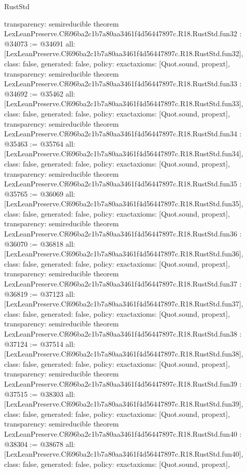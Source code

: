 \begin{lexlean}{RustStd}
\begin{coremodule}
{  transparency: semireducible
}
theorem LexLeanPreserve.Cf696ba2c1b7a80aa3461f4d56447897c.R18.RustStd.fun32 : @34073 := @34691 {
  all: [LexLeanPreserve.Cf696ba2c1b7a80aa3461f4d56447897c.R18.RustStd.fun32],
  class: false,
  generated: false,
  policy: exact{axioms: [Quot.sound, propext]},
  transparency: semireducible
}
theorem LexLeanPreserve.Cf696ba2c1b7a80aa3461f4d56447897c.R18.RustStd.fun33 : @34692 := @35462 {
  all: [LexLeanPreserve.Cf696ba2c1b7a80aa3461f4d56447897c.R18.RustStd.fun33],
  class: false,
  generated: false,
  policy: exact{axioms: [Quot.sound, propext]},
  transparency: semireducible
}
theorem LexLeanPreserve.Cf696ba2c1b7a80aa3461f4d56447897c.R18.RustStd.fun34 : @35463 := @35764 {
  all: [LexLeanPreserve.Cf696ba2c1b7a80aa3461f4d56447897c.R18.RustStd.fun34],
  class: false,
  generated: false,
  policy: exact{axioms: [Quot.sound, propext]},
  transparency: semireducible
}
theorem LexLeanPreserve.Cf696ba2c1b7a80aa3461f4d56447897c.R18.RustStd.fun35 : @35765 := @36069 {
  all: [LexLeanPreserve.Cf696ba2c1b7a80aa3461f4d56447897c.R18.RustStd.fun35],
  class: false,
  generated: false,
  policy: exact{axioms: [Quot.sound, propext]},
  transparency: semireducible
}
theorem LexLeanPreserve.Cf696ba2c1b7a80aa3461f4d56447897c.R18.RustStd.fun36 : @36070 := @36818 {
  all: [LexLeanPreserve.Cf696ba2c1b7a80aa3461f4d56447897c.R18.RustStd.fun36],
  class: false,
  generated: false,
  policy: exact{axioms: [Quot.sound, propext]},
  transparency: semireducible
}
theorem LexLeanPreserve.Cf696ba2c1b7a80aa3461f4d56447897c.R18.RustStd.fun37 : @36819 := @37123 {
  all: [LexLeanPreserve.Cf696ba2c1b7a80aa3461f4d56447897c.R18.RustStd.fun37],
  class: false,
  generated: false,
  policy: exact{axioms: [Quot.sound, propext]},
  transparency: semireducible
}
theorem LexLeanPreserve.Cf696ba2c1b7a80aa3461f4d56447897c.R18.RustStd.fun38 : @37124 := @37514 {
  all: [LexLeanPreserve.Cf696ba2c1b7a80aa3461f4d56447897c.R18.RustStd.fun38],
  class: false,
  generated: false,
  policy: exact{axioms: [Quot.sound, propext]},
  transparency: semireducible
}
theorem LexLeanPreserve.Cf696ba2c1b7a80aa3461f4d56447897c.R18.RustStd.fun39 : @37515 := @38303 {
  all: [LexLeanPreserve.Cf696ba2c1b7a80aa3461f4d56447897c.R18.RustStd.fun39],
  class: false,
  generated: false,
  policy: exact{axioms: [Quot.sound, propext]},
  transparency: semireducible
}
theorem LexLeanPreserve.Cf696ba2c1b7a80aa3461f4d56447897c.R18.RustStd.fun40 : @38304 := @38678 {
  all: [LexLeanPreserve.Cf696ba2c1b7a80aa3461f4d56447897c.R18.RustStd.fun40],
  class: false,
  generated: false,
  policy: exact{axioms: [Quot.sound, propext]},
}
\end{coremodule}
\end{lexlean}
